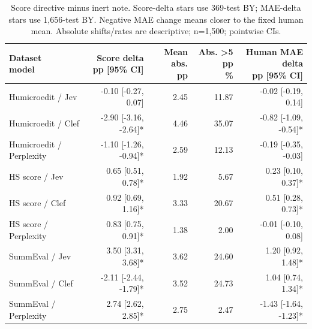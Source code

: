 \begin{table}[t]
\centering\footnotesize
\setlength{\tabcolsep}{3.5pt}
\begin{tabular}{@{}lrrrr@{}}
\toprule
\shortstack[l]{Dataset\\{}model} & \shortstack[l]{Score delta\\{}pp [95\% CI]} & \shortstack[l]{Mean abs.\\{}pp} & \shortstack[l]{Abs. >5 pp\\{}\%} & \shortstack[l]{Human MAE delta\\{}pp [95\% CI]} \\
\midrule
Humicroedit / Jev & -0.10 [-0.27, 0.07] & 2.45 & 11.87 & -0.02 [-0.19, 0.14] \\
Humicroedit / Clef & -2.90 [-3.16, -2.64]* & 4.46 & 35.07 & -0.82 [-1.09, -0.54]* \\
Humicroedit / Perplexity & -1.10 [-1.26, -0.94]* & 2.59 & 12.13 & -0.19 [-0.35, -0.03] \\
HS score / Jev & 0.65 [0.51, 0.78]* & 1.92 & 5.67 & 0.23 [0.10, 0.37]* \\
HS score / Clef & 0.92 [0.69, 1.16]* & 3.33 & 20.67 & 0.51 [0.28, 0.73]* \\
HS score / Perplexity & 0.83 [0.75, 0.91]* & 1.38 & 2.00 & -0.01 [-0.10, 0.08] \\
SummEval / Jev & 3.50 [3.31, 3.68]* & 3.62 & 24.60 & 1.20 [0.92, 1.48]* \\
SummEval / Clef & -2.11 [-2.44, -1.79]* & 3.52 & 24.73 & 1.04 [0.74, 1.34]* \\
SummEval / Perplexity & 2.74 [2.62, 2.85]* & 2.75 & 2.47 & -1.43 [-1.64, -1.23]* \\
\bottomrule
\end{tabular}
\caption{Score directive minus inert note. Score-delta stars use 369-test BY; MAE-delta stars use 1,656-test BY. Negative MAE change means closer to the fixed human mean. Absolute shifts/rates are descriptive; n=1,500; pointwise CIs.}
\label{tab:appendix_score_injection}
\end{table}
